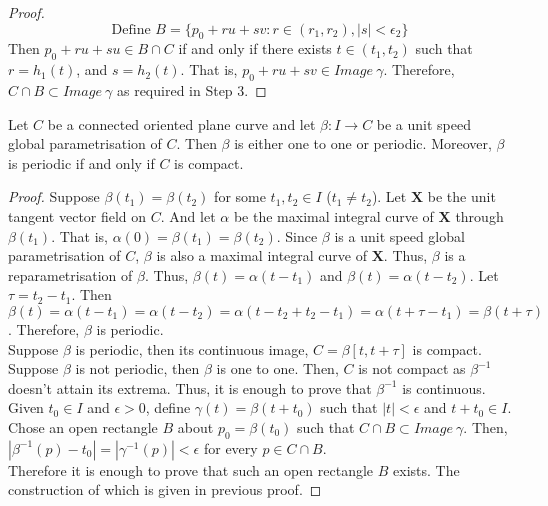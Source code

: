 \begin{proof}
	\begin{equation}
		\text{Define } B = \{ p_0 + ru + sv : r \in (r_1,r_2), |s| < \epsilon_2 \}
	\end{equation}
	Then $p_0 + ru + su \in B \cap C$ if and only if there exists $t \in (t_1,t_2)$ such that $r = h_1(t)$, and $s=h_2(t)$. That is, $p_0 + ru + sv \in Image\ \gamma$. Therefore, $C \cap B \subset Image\ \gamma$ as required in Step 3.
\end{proof}

\begin{theorem}
	Let $C$ be a connected oriented plane curve and let $\beta : I \to C$ be a unit speed global parametrisation of $C$. Then $\beta$ is either one to one or periodic. Moreover, $\beta$ is periodic if and only if $C$ is compact.
\end{theorem}
\begin{proof}
	Suppose $\beta(t_1) = \beta(t_2)$ for some $t_1,t_2 \in I$ ($t_1 \ne t_2$). Let $\mathbf{X}$ be the unit tangent vector field on $C$. And let $\alpha$ be the maximal integral curve of $\mathbf{X}$ through $\beta(t_1)$. That is, $\alpha(0) = \beta(t_1) = \beta(t_2)$. Since $\beta$ is a unit speed global parametrisation of $C$, $\beta$ is also a maximal integral curve of $\mathbf{X}$. Thus, $\beta$ is a reparametrisation of $\beta$. Thus, $\beta(t) = \alpha(t-t_1)$ and $\beta(t) = \alpha(t-t_2)$. Let $\tau = t_2-t_1$. Then $\beta(t) = \alpha(t-t_1) = \alpha(t-t_2) = \alpha(t-t_2+t_2-t_1) = \alpha(t+\tau-t_1) = \beta(t+\tau)$. Therefore, $\beta$ is periodic. \\

	Suppose $\beta$ is periodic, then its continuous image, $C = \beta[t,t+\tau]$ is compact. Suppose $\beta$ is not periodic, then $\beta$ is one to one. Then, $C$ is not compact as $\beta^{-1}$ doesn't attain its extrema. Thus, it is enough to prove that $\beta^{-1}$ is continuous.\\

	Given $t_0 \in I$ and $\epsilon > 0$, define $\gamma(t) = \beta(t+t_0)$ such that $|t| < \epsilon$ and $t+t_0 \in I$. Chose an open rectangle $B$ about $p_0 = \beta(t_0)$ such that $C \cap B \subset Image\ \gamma$. Then, $|\beta^{-1}(p) - t_0 | = | \gamma^{-1}(p) | < \epsilon$ for every $p \in C \cap B$.\\

	Therefore it is enough to prove that such an open rectangle $B$ exists. The construction of which is given in previous proof.
\end{proof}

